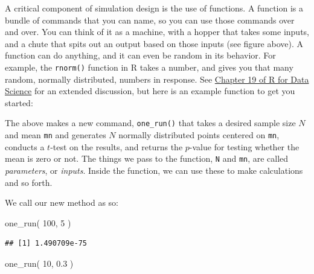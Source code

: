 \documentclass[
]{book}
\newenvironment{Shaded}{\begin{snugshade}}{\end{snugshade}}
\newcommand{\AttributeTok}[1]{\textcolor[rgb]{0.77,0.63,0.00}{#1}}
\newcommand{\ControlFlowTok}[1]{\textcolor[rgb]{0.13,0.29,0.53}{\textbf{#1}}}
\newcommand{\DecValTok}[1]{\textcolor[rgb]{0.00,0.00,0.81}{#1}}
\newcommand{\FloatTok}[1]{\textcolor[rgb]{0.00,0.00,0.81}{#1}}
\newcommand{\FunctionTok}[1]{\textcolor[rgb]{0.00,0.00,0.00}{#1}}
\newcommand{\NormalTok}[1]{#1}
\newcommand{\OtherTok}[1]{\textcolor[rgb]{0.56,0.35,0.01}{#1}}
\newcommand{\SpecialCharTok}[1]{\textcolor[rgb]{0.00,0.00,0.00}{#1}}
\begin{document}
A critical component of simulation design is the use of functions.
A function is a bundle of commands that you can name, so you can use those commands over and over.
You can think of it as a machine, with a hopper that takes some inputs, and a chute that spits out an output based on those inputs (see figure above).
A function can do anything, and it can even be random in its behavior.
For example, the \texttt{rnorm()} function in R takes a number, and gives you that many random, normally distributed, numbers in response.
See \href{https://r4ds.had.co.nz/functions.html}{Chapter 19 of R for Data Science} for an extended discussion, but here is an example function to get you started:

\begin{Shaded}
\end{Shaded}

The above makes a new command, \texttt{one\_run()} that takes a desired sample size \(N\) and mean \texttt{mn} and generates \(N\) normally distributed points centered on \texttt{mn}, conducts a \(t\)-test on the results, and returns the \(p\)-value for testing whether the mean is zero or not.
The things we pass to the function, \texttt{N} and \texttt{mn}, are called \emph{parameters}, or \emph{inputs}.
Inside the function, we can use these to make calculations and so forth.

We call our new method as so:

\begin{Shaded}
\begin{Highlighting}[]
\FunctionTok{one\_run}\NormalTok{( }\DecValTok{100}\NormalTok{, }\DecValTok{5}\NormalTok{ )}
\end{Highlighting}
\end{Shaded}

\begin{verbatim}
## [1] 1.490709e-75
\end{verbatim}

\begin{Shaded}
\begin{Highlighting}[]
\FunctionTok{one\_run}\NormalTok{( }\DecValTok{10}\NormalTok{, }\FloatTok{0.3}\NormalTok{ )}
\end{Highlighting}
\end{Shaded}
\end{document}
